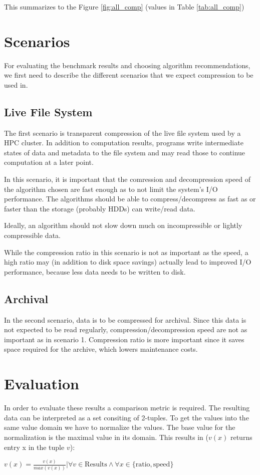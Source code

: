 \documentclass[
	12pt,
	a4paper,
	BCOR10mm,
	DIV14,
	listof=totoc,
	bibliography=totoc,
	headsepline
]{scrreprt}
\begin{document}

This summarizes to the Figure \ref{fig:all_comp} (values in Table \ref{tab:all_comp})


\FloatBarrier

\section{Scenarios}

For evaluating the benchmark results and choosing algorithm recommendations, we first need to describe the different scenarios that we expect compression to be used in.

\subsection{Live File System}

The first scenario is transparent compression of the live file system used by a HPC cluster. In addition to computation results, programs write intermediate states of data and metadata to the file system and may read those to continue computation at a later point.

In this scenario, it is important that the comression and decompression speed of the algorithm chosen are fast enough as to not limit the system's I/O performance.  The algorithms should be able to compress/decompress as fast as or faster than the storage (probably HDDs) can write/read data.

Ideally, an algorithm should not slow down much on incompressible or lightly compressible data.

While the compression ratio in this scenario is not as important as the speed, a high ratio may (in addition to disk space savings) actually lead to improved I/O performance, because less data needs to be written to disk.

\subsection{Archival}

In the second scenario, data is to be compressed for archival. Since this data is not expected to be read regularly, compression/decompression speed are not as important as in scenario 1. Compression ratio is more important since it saves space required for the archive, which lowers maintenance costs.

\section{Evaluation}
In order to evaluate these results a comparison metric is required.
The resulting data can be interpreted as a set consiting of 2-tuples.
To get the values into the same value domain we have to normalize the values.
The base value for the normalization is the maximal value in its domain.
This results in (\(v(x)\) returns entry x in the tuple \(v\)):
\begin{center}
	\(
	   v(x) = \frac{v(x)}{max(v(x))}|\forall v \in \text{Results} \land \forall x \in \{\text{ratio}, \text{speed}\}
	\)
\end{center}
\end{document}
